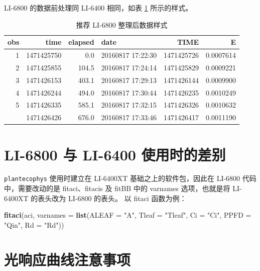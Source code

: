 \documentclass[
]{krantz}
\makeatletter
\newenvironment{Shaded}{\begin{snugshade}}{\end{snugshade}}
\newcommand{\DataTypeTok}[1]{\textcolor[rgb]{0.13,0.29,0.53}{#1}}
\newcommand{\KeywordTok}[1]{\textcolor[rgb]{0.13,0.29,0.53}{\textbf{#1}}}
\newcommand{\NormalTok}[1]{#1}
\newcommand{\StringTok}[1]{\textcolor[rgb]{0.31,0.60,0.02}{#1}}
\newenvironment{kframe}{%
\medskip{}
\setlength{\fboxsep}{.8em}
 \def\at@end@of@kframe{}%
 \ifinner\ifhmode%
  \def\at@end@of@kframe{\end{minipage}}%
  \begin{minipage}{\columnwidth}%
 \fi\fi%
 \def\FrameCommand##1{\hskip\@totalleftmargin \hskip-\fboxsep
 \colorbox{shadecolor}{##1}\hskip-\fboxsep
     \hskip-\linewidth \hskip-\@totalleftmargin \hskip\columnwidth}%
 \MakeFramed {\advance\hsize-\width
   \@totalleftmargin\z@ \linewidth\hsize
   \@setminipage}}%
 {\par\unskip\endMakeFramed%
 \at@end@of@kframe}
\renewenvironment{Shaded}{\begin{kframe}}{\end{kframe}}
\makeatother
\begin{document}
LI-6800 的数据前处理同 LI-6400 相同，如表 \ref{tab:head6800} 所示的样式。

\begin{longtable}[t]{rrrlrr}
\caption{\label{tab:head6800}推荐 LI-6800 整理后数据样式}\\
\toprule
obs & time & elapsed & date & TIME & E\\
\midrule
1 & 1471425750 & 0.0 & 20160817 17:22:30 & 1471425726 & 0.0007614\\
2 & 1471425855 & 104.5 & 20160817 17:24:14 & 1471425829 & 0.0009221\\
3 & 1471426153 & 403.1 & 20160817 17:29:13 & 1471426144 & 0.0009900\\
4 & 1471426244 & 494.0 & 20160817 17:30:44 & 1471426235 & 0.0010249\\
5 & 1471426335 & 585.1 & 20160817 17:32:15 & 1471426326 & 0.0010632\\
\addlinespace
6 & 1471426426 & 676.0 & 20160817 17:33:46 & 1471426417 & 0.0011190\\
\bottomrule
\end{longtable}

\hypertarget{dif}{%
\section{LI-6800 与 LI-6400 使用时的差别}\label{dif}}

\texttt{plantecophys} 使用时建立在 LI-6400XT 基础之上的软件包，因此在 LI-6800 代码中，需要改动的是 fitaci、fitacis 及 fitBB 中的 varnames 选项，也就是将 LI-6400XT 的表头改为 LI-6800 的表头。
以 fitaci 函数为例：

\begin{Shaded}
\begin{Highlighting}[]
 \KeywordTok{fitaci}\NormalTok{(aci, }\DataTypeTok{varnames =} 
        \KeywordTok{list}\NormalTok{(}\DataTypeTok{ALEAF =} \StringTok{"A"}\NormalTok{, }\DataTypeTok{Tleaf =} \StringTok{"Tleaf"}\NormalTok{, }\DataTypeTok{Ci =} \StringTok{"Ci"}\NormalTok{, }
          \DataTypeTok{PPFD  =} \StringTok{"Qin"}\NormalTok{, }\DataTypeTok{Rd =} \StringTok{"Rd"}\NormalTok{))}
\end{Highlighting}
\end{Shaded}

\hypertarget{notice}{%
\section{光响应曲线注意事项}\label{notice}}
\end{document}
